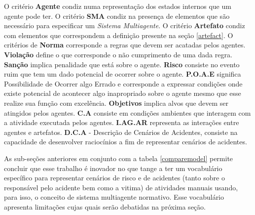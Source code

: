 O critério \textbf{Agente} condiz numa representação dos estados internos que um agente pode ter. O critério \textbf{SMA} condiz na presença de elementos que são necessário para
especificar um \textit{Sistema Multiagente}. O critério \textbf{Artefato} condiz com elementos que correspondem a definição presente na seção \ref{artefact}. O critérios de 
\textbf{Norma} corresponde a regras que devem ser acatadas pelos agentes. \textbf{Violação} define o que corresponde o não cumprimento de uma dada regra. \textbf{Sanção} implica 
penalidade que está sobre o agente. \textbf{Risco} consiste no evento ruim que tem um dado potencial de ocorrer sobre o agente. \textbf{P.O.A.E} significa Possibilidade de Ocorrer 
algo Errado e corresponde a expressar condições onde existe potencial de acontecer algo inapropriado sobre o agente mesmo que esse realize sua função com excelência.  \textbf{Objetivos} 
implica alvos que devem ser atingidos pelos agentes. \textbf{C.A} consiste em condições ambientes que interagem com a atividade executada pelos agentes. \textbf{I.AG.AR} representa 
as interações entre agentes e artefatos. \textbf{D.C.A} - Descrição de Cenários de Acidentes, consiste na capacidade de desenvolver raciocínios a fim de representar cenários de acidentes.

As sub-seções anteriores em conjunto com a tabela \ref{comparemodel} permite concluir que esse trabalho é inovador no que tange a ter um vocabulário específico para representar cenários 
de risco e de acidentes (tanto sobre o responsável pelo acidente bem como a vitima) de atividades manuais usando, para isso, o conceito de sistema multiagente normativo. Esse 
vocabulário apresenta limitações cujas quais serão debatidas na próxima seção. 